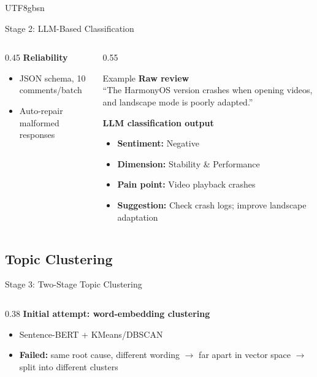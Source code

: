 \documentclass[11pt,aspectratio=169]{beamer}
\begin{document}
\begin{CJK*}{UTF8}{gbsn}
\begin{frame}{Stage 2: LLM-Based Classification}
\begin{columns}[T]
\begin{column}{0.45\textwidth}
      \vspace{0.08cm}
      \textbf{Reliability}
      \begin{itemize}
        \setlength\itemsep{0pt}
        \item JSON schema, 10 comments/batch
        \item Auto-repair malformed responses
      \end{itemize}
    \end{column}
    \begin{column}{0.55\textwidth}
      \begin{exampleblock}{Example}
        \scriptsize
        \textbf{Raw review}\\
        ``The HarmonyOS version crashes when opening videos, and landscape mode is poorly adapted.''

        \vspace{0.1cm}
        \textbf{LLM classification output}
        \begin{itemize}
          \setlength\itemsep{1pt}
          \item \textbf{Sentiment:} \textcolor{red!60!black}{Negative}
          \item \textbf{Dimension:} Stability \& Performance
          \item \textbf{Pain point:} Video playback crashes
          \item \textbf{Suggestion:} Check crash logs; improve landscape adaptation
        \end{itemize}
      \end{exampleblock}
    \end{column}
  \end{columns}
\end{frame}

\subsection{Topic Clustering}

\begin{frame}{Stage 3: Two-Stage Topic Clustering}
  \footnotesize
  \begin{columns}[T]
    \begin{column}{0.38\textwidth}
      \textbf{Initial attempt: word-embedding clustering}
      \begin{itemize}
        \setlength\itemsep{0pt}
        \item Sentence-BERT + KMeans/DBSCAN
        \item \textbf{Failed:} same root cause, different wording $\rightarrow$ far apart in vector space $\rightarrow$ split into different clusters
      \end{itemize}


\end{column}
\end{columns}
\end{frame}
\end{CJK*}
\end{document}
